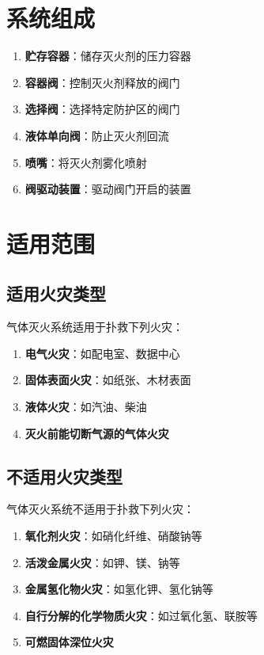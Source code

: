\documentclass[12pt,UTF8]{ctexbook}
\begin{document}
\section{系统组成}

\begin{enumerate}
    \item \textbf{贮存容器}：储存灭火剂的压力容器
    \item \textbf{容器阀}：控制灭火剂释放的阀门
    \item \textbf{选择阀}：选择特定防护区的阀门
    \item \textbf{液体单向阀}：防止灭火剂回流
    \item \textbf{喷嘴}：将灭火剂雾化喷射
    \item \textbf{阀驱动装置}：驱动阀门开启的装置
\end{enumerate}

\section{适用范围}

\subsection{适用火灾类型}

气体灭火系统适用于扑救下列火灾：

\begin{enumerate}
    \item \textbf{电气火灾}：如配电室、数据中心
    \item \textbf{固体表面火灾}：如纸张、木材表面
    \item \textbf{液体火灾}：如汽油、柴油
    \item \textbf{灭火前能切断气源的气体火灾}
\end{enumerate}

\subsection{不适用火灾类型}

气体灭火系统不适用于扑救下列火灾：

\begin{enumerate}
    \item \textbf{氧化剂火灾}：如硝化纤维、硝酸钠等
    \item \textbf{活泼金属火灾}：如钾、镁、钠等
    \item \textbf{金属氢化物火灾}：如氢化钾、氢化钠等
    \item \textbf{自行分解的化学物质火灾}：如过氧化氢、联胺等
    \item \textbf{可燃固体深位火灾}
\end{enumerate}
\end{document}
